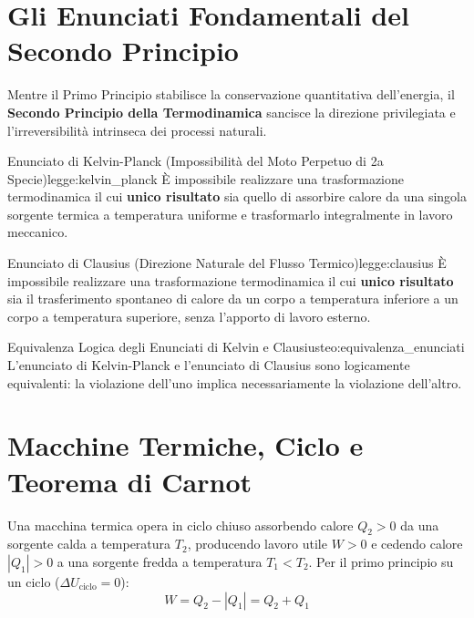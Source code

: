 \vspace{0.5em}

\section{Gli Enunciati Fondamentali del Secondo Principio}
\label{sec:enunciati_secondo_principio}

Mentre il Primo Principio stabilisce la conservazione quantitativa dell'energia, il \textbf{Secondo Principio della Termodinamica} sancisce la direzione privilegiata e l'irreversibilità intrinseca dei processi naturali.

\begin{legge}{Enunciato di Kelvin-Planck (Impossibilità del Moto Perpetuo di 2a Specie)}{legge:kelvin_planck}
È impossibile realizzare una trasformazione termodinamica il cui \textbf{unico risultato} sia quello di assorbire calore da una singola sorgente termica a temperatura uniforme e trasformarlo integralmente in lavoro meccanico.
\end{legge}

\begin{legge}{Enunciato di Clausius (Direzione Naturale del Flusso Termico)}{legge:clausius}
È impossibile realizzare una trasformazione termodinamica il cui \textbf{unico risultato} sia il trasferimento spontaneo di calore da un corpo a temperatura inferiore a un corpo a temperatura superiore, senza l'apporto di lavoro esterno.
\end{legge}

\begin{teorema}{Equivalenza Logica degli Enunciati di Kelvin e Clausius}{teo:equivalenza_enunciati}
L'enunciato di Kelvin-Planck e l'enunciato di Clausius sono logicamente equivalenti: la violazione dell'uno implica necessariamente la violazione dell'altro.
\end{teorema}

\section{Macchine Termiche, Ciclo e Teorema di Carnot}
\label{sec:carnot}

Una macchina termica opera in ciclo chiuso assorbendo calore $Q_2 > 0$ da una sorgente calda a temperatura $T_2$, producendo lavoro utile $W > 0$ e cedendo calore $|Q_1| > 0$ a una sorgente fredda a temperatura $T_1 < T_2$.
Per il primo principio su un ciclo ($\Delta U_{\text{ciclo}} = 0$):
\begin{equation}
    W = Q_2 - |Q_1| = Q_2 + Q_1
\end{equation}

